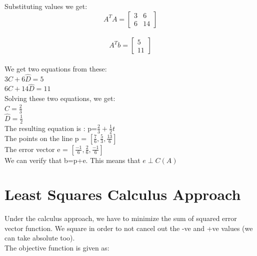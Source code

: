 \documentclass[]{article}
\begin{document}
\noindent
Substituting values we get:\\

\noindent
\[
A^TA=\begin{bmatrix}
	3&6\\
	6&14
\end{bmatrix}
\]\\

\[
A^Tb=\begin{bmatrix}
	5\\
	11
\end{bmatrix}
\]\\

\noindent
We get two equations from these:\\

\noindent
$3\hat{C}+6\hat{D}=5$\\
$6\hat{C}+14\hat{D}=11$\\

\noindent
Solving these two equations, we get:\\

\noindent
$\hat{C}=\frac{2}{3}$\\

\noindent
$\hat{D}=\frac{1}{2}$\\

\noindent
The resulting equation is :
p=$\frac{2}{3}+\frac{1}{2}t$\\

\noindent
The points on the line p = $[\frac{7}{6}, \frac{5}{3}, \frac{13}{6}]$\\

\noindent
The error vector e = $[\frac{-1}{6}, \frac{2}{6}, \frac{-1}{6}]$\\

\noindent
We can verify that b=p+e. This means that $e \perp C(A)$\\

\vspace{10pt}

\section{Least Squares Calculus Approach}
\vspace{10pt}

\noindent
Under the calculus approach, we have to minimize the sum of squared error vector function. We square in order to not cancel out the -ve and +ve values (we can take absolute too).\\

\noindent
The objective function is given as:\\
\end{document}
